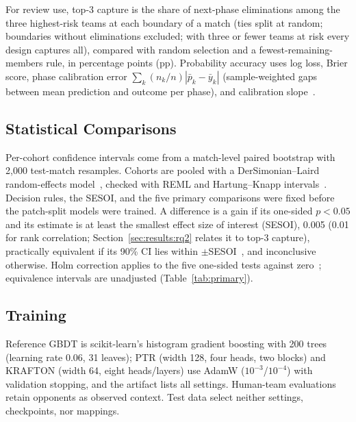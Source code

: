 \documentclass[sigconf,anonymous,nonacm]{acmart}
\begin{document}
For review use, top-3 capture is the share of next-phase eliminations among the three highest-risk teams at each boundary of a match (ties split at random; boundaries without eliminations excluded; with three or fewer teams at risk every design captures all), compared with random selection and a fewest-remaining-members rule, in percentage points (pp). Probability accuracy uses log loss, Brier score, phase calibration error $\sum_k(n_k/n)|\bar p_k-\bar y_k|$ (sample-weighted gaps between mean prediction and outcome per phase), and calibration slope~\cite{VanCalster16}.

\subsection{Statistical Comparisons}
Per-cohort confidence intervals come from a match-level paired bootstrap with 2,000 test-match resamples.
Cohorts are pooled with a DerSimonian--Laird random-effects model~\cite{DerSimonian86}, checked with REML and Hartung--Knapp intervals~\cite{HartungKnapp01}.
Decision rules, the SESOI, and the five primary comparisons were fixed before the patch-split models were trained. A difference is a gain if its one-sided $p<0.05$ and its estimate is at least the smallest effect size of interest (SESOI), 0.005 (0.01 for rank correlation; Section~\ref{sec:results:rq2} relates it to top-3 capture), practically equivalent if its 90\% CI lies within $\pm$SESOI~\cite{Schuirmann87}, and inconclusive otherwise.
Holm correction applies to the five one-sided tests against zero~\cite{Holm79}; equivalence intervals are unadjusted (Table~\ref{tab:primary}).

\subsection{Training}
Reference GBDT is scikit-learn's histogram gradient boosting with 200 trees (learning rate 0.06, 31 leaves); PTR (width 128, four heads, two blocks) and KRAFTON (width 64, eight heads/layers) use AdamW ($10^{-3}$/$10^{-4}$) with validation stopping, and the artifact lists all settings. Human-team evaluations retain opponents as observed context. Test data select neither settings, checkpoints, nor mappings.


\end{document}
